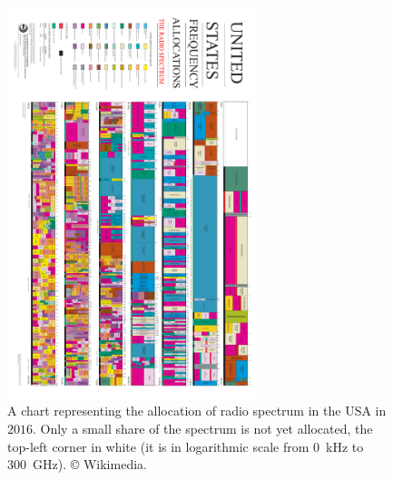 \begin{figure}[h!]
    \centering
    \includegraphics[width=0.65\textwidth,angle=90]{United_States_Frequency_Allocations_Chart_2016_The_Radio_Spectrum.pdf}
    \caption[A chart representing the allocation of radio spectrum in the USA in $2016$]{A chart representing the allocation of radio spectrum in the USA in $2016$. Only a small share of the spectrum is not yet allocated, the top-left corner in white (it is in logarithmic scale from \SI{0}{\kilo\hertz} to \SI{300}{\giga\hertz}). \copyright{} Wikimedia.}
    \label{fig:1:United_States_Frequency_Allocations_Chart_2016_The_Radio_Spectrum}
\end{figure}


